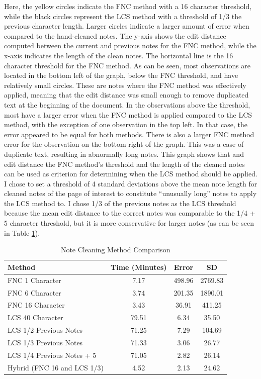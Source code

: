 \documentclass[print]{nuthesis}
\begin{document}
Here, the yellow circles indicate the FNC method with a 16 character threshold, while the black circles represent the LCS method with a threshold of 1/3 the previous character length.
Larger circles indicate a larger amount of error when compared to the hand-cleaned notes.
The y-axis shows the edit distance computed between the current and previous notes for the FNC method, while the x-axis indicates the length of the clean notes.
The horizontal line is the 16 character threshold for the FNC method.
As can be seen, most observations are located in the bottom left of the graph, below the FNC threshold, and have relatively small circles.
These are notes where the FNC method was effectively applied, meaning that the edit distance was small enough to remove duplicated text at the beginning of the document.
In the observations above the threshold, most have a larger error when the FNC method is applied compared to the LCS method, with the exception of one observation in the top left.
In that case, the error appeared to be equal for both methods.
There is also a larger FNC method error for the observation on the bottom right of the graph.
This was a case of duplicate text, resulting in abnormally long notes.
This graph shows that and edit distance the FNC method's threshold and the length of the cleaned notes can be used as criterion for determining when the LCS method should be applied.
I chose to set a threshold of 4 standard deviations above the mean note length for cleaned notes of the page of interest to constitute ``unusually long'' notes to apply the LCS method to.
I chose 1/3 of the previous notes as the LCS threshold because the mean edit distance to the correct notes was comparable to the 1/4 + 5 character threshold, but it is more conservative for larger notes (as can be seen in Table \ref{tab:cleancompare}).

\begin{table}

\caption{\label{tab:cleancompare}Note Cleaning Method Comparison}
\centering
\begin{tabular}[t]{l|c|c|c}
\hline
Method & Time (Minutes) & Error & SD\\
\hline
FNC 1 Character & 7.17 & 498.96 & 2769.83\\
\hline
FNC 6 Character & 3.74 & 201.35 & 1890.01\\
\hline
FNC 16 Character & 3.43 & 36.91 & 411.25\\
\hline
LCS 40 Character & 79.51 & 6.34 & 35.50\\
\hline
LCS 1/2 Previous Notes & 71.25 & 7.29 & 104.69\\
\hline
LCS 1/3 Previous Notes & 71.33 & 3.06 & 26.77\\
\hline
LCS 1/4 Previous Notes + 5 & 71.05 & 2.82 & 26.14\\
\hline
Hybrid (FNC 16 and LCS 1/3) & 4.52 & 2.13 & 24.62\\
\hline
\end{tabular}
\end{table}
\end{document}
